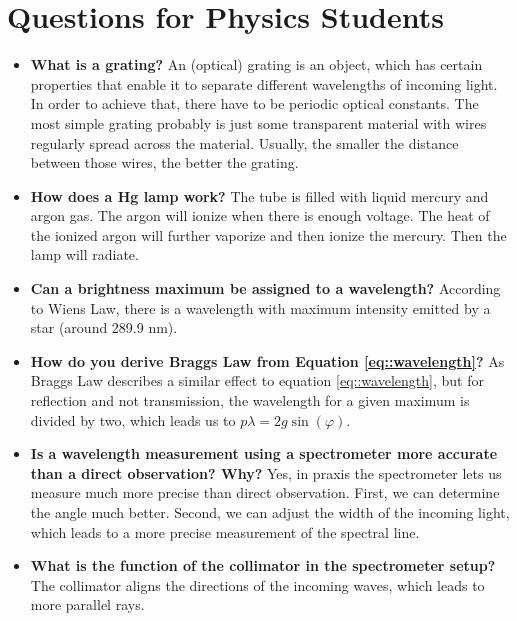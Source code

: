 \section{Questions for Physics Students}

\begin{itemize}
	\item \textbf{What is a grating?}
	An (optical) grating is an object, which has certain properties that enable it to separate different wavelengths of incoming light.
	In order to achieve that, there have to be periodic optical constants.
	The most simple grating probably is just some transparent material with wires regularly spread across the material.
	Usually, the smaller the distance between those wires, the better the grating.
	
	\item \textbf{How does a Hg lamp work?}
	The tube is filled with liquid mercury and argon gas. 
	The argon will ionize when there is enough voltage.
	The heat of the ionized argon will further vaporize and then ionize the mercury.
	Then the lamp will radiate.
	
	
	\item \textbf{Can a brightness maximum be assigned to a
		wavelength?}
	According to Wiens Law, there is a wavelength with maximum intensity emitted by a star (around 289.9 nm).
	
	\item \textbf{How do you derive Braggs Law from Equation \ref{eq::wavelength}?}
	As Braggs Law describes a similar effect to equation \ref{eq::wavelength}, but for reflection and not transmission, the wavelength for a given maximum is divided by two, which leads us to $p\lambda = 2 g \sin(\varphi)$.
	
	\item \textbf{Is a wavelength measurement using a spectrometer more accurate than a direct observation? Why?}
	Yes, in praxis the spectrometer lets us measure much more precise than direct observation. 
	First, we can determine the angle much better.
	Second, we can adjust the width of the incoming light, which leads to a more precise measurement of the spectral line.
	
	\item \textbf{What is the function of the collimator in the
		spectrometer setup?}
	The collimator aligns the directions of the incoming waves, which leads to more parallel rays.
\end{itemize}